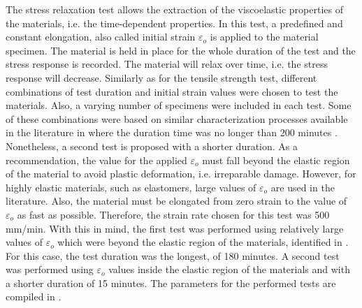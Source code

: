 The stress relaxation test allows the extraction of the viscoelastic properties of the materials, i.e. the time-dependent properties. In this test, a predefined and constant elongation, also called initial strain $\varepsilon_o$ is applied to the material specimen. The material is held in place for the whole duration of the test and the stress response is recorded. The material will relax over time, i.e. the stress response will decrease. Similarly as for the tensile strength test, different combinations of test duration and initial strain values were chosen to test the materials. Also, a varying number of specimens were included in each test. Some of these combinations were based on similar characterization processes available in the literature in where the duration time was no longer than 200 minutes \cite{case2015soft,delin1995volume}. Nonetheless, a second test is proposed with a shorter duration. As a recommendation, the value for the applied $\varepsilon_o$ must fall beyond the elastic region of the material to avoid plastic deformation, i.e. irreparable damage. However, for highly elastic materials, such as elastomers, large values of $\varepsilon_o$ are used in the literature. Also, the material must be elongated from zero strain to the value of $\varepsilon_o$ as fast as possible. Therefore, the strain rate chosen for this test was  500 mm/min. With this in mind, the first test was performed using relatively large values of $\varepsilon_o$ which were beyond the elastic region of the materials, identified in . For this case, the test duration was the longest, of 180 minutes. A second test was performed using $\varepsilon_o$ values inside the elastic region of the materials and with a shorter duration of 15 minutes. The parameters for the performed tests are compiled in .

